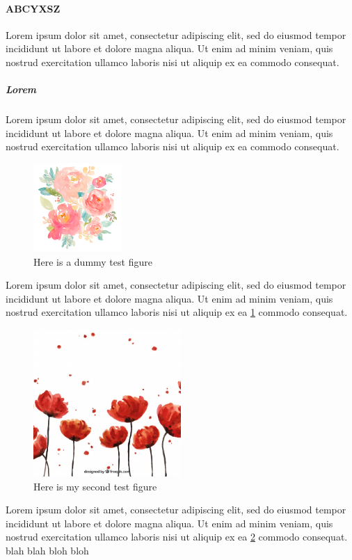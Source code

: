 \documentclass[a4paper,12pt]{article}
\begin{document}
\paragraph*{ABCYXSZ} Lorem ipsum dolor sit amet, consectetur adipiscing elit, sed do eiusmod tempor incididunt ut labore et dolore magna aliqua. Ut enim ad minim veniam, quis nostrud exercitation ullamco laboris nisi ut aliquip ex ea commodo consequat.
\subparagraph{Lorem} Lorem ipsum dolor sit amet, consectetur adipiscing elit, sed do eiusmod tempor incididunt ut labore et dolore magna aliqua. Ut enim ad minim veniam, quis nostrud exercitation ullamco laboris nisi ut aliquip ex ea commodo consequat.\\
\begin{figure}
\centering
\includegraphics[width=0.3\textwidth]{Images/dummy_2}
\caption{Here is a dummy test figure}
\label{floral}
\end{figure}
Lorem ipsum dolor sit amet, consectetur adipiscing elit, sed do eiusmod tempor incididunt ut labore et dolore magna aliqua. Ut enim ad minim veniam, quis nostrud exercitation ullamco laboris nisi ut aliquip ex ea \ref{floral} commodo consequat.\\
\linebreak
\begin{figure}
\centering
\includegraphics[width=0.5\textwidth]{Images/dummy_3}
\caption{Here is my second test figure}
\label{floral2}
\end{figure}
Lorem ipsum dolor sit amet, consectetur adipiscing elit, sed do eiusmod tempor incididunt ut labore et dolore magna aliqua. Ut enim ad minim veniam, quis nostrud exercitation ullamco laboris nisi ut aliquip ex ea \ref{floral2} commodo consequat.
blah blah bloh bloh
\end{document}
